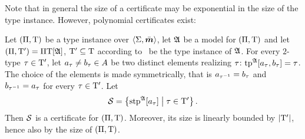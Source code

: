Note that in general the size of a certificate may be exponential in
the size of the type instance. However, polynomial certificates exist:
\begin{lemma}\label{lem:cert-extract}
Let $(\Pi,\mathrm{T})$ be a type instance over $\left\langle \mathrm{\Sigma},\bar{\bm{m}} \right\rangle$,
let $\mathfrak{A}$ be a model for $(\Pi,\mathrm{T})$ and let 
$(\Pi,{\mathrm{T}'}) = \Pi\mathrm{T}[\mathfrak{A}]$, ${\mathrm{T}'} \subseteq \mathrm{T}$ according
to~ be the type instance of $\mathfrak{A}$.
For every $2$-type $\tau \in {\mathrm{T}'}$,
let $a_{\tau} \neq b_{\tau} \in A$ be two distinct elements realizing
$\tau$: $\operatorname{tp}^{\mathfrak{A}}[a_{\tau},b_{\tau}] = \tau$. The choice of the
elements is made symmetrically, that is $a_{\tau^{-1}} = b_{\tau}$ and
$b_{\tau^{-1}} = a_{\tau}$ for every $\tau\in{\mathrm{T}'}$.
Let 
\[
  \mathcal{S} = \left\{\operatorname{stp}^{\mathfrak{A}}[a_{\tau}]\mathrel{}\middle|\mathrel{}\tau\in{\mathrm{T}'}\right\}.
\]
Then $\mathcal{S}$ is a certificate for $(\Pi,\mathrm{T})$. Moreover, its size is
linearly bounded by $\left|{\mathrm{T}'}\right|$, hence also by the size of $(\Pi,\mathrm{T})$.
\end{lemma}

